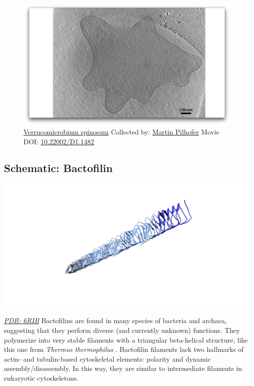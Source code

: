 \documentclass[]{tufte-book}
\begin{document}
\begin{figure}
\includegraphics{movie_stills/3_6} \caption[\protect\hyperlink{tree}{Verrucomicrobium spinosum} Collected
by: \protect\hyperlink{martin_pilhofer}{Martin Pilhofer} Movie DOI:
\href{https://doi.org/10.22002/D1.1482}{10.22002/D1.1482}]{\protect\hyperlink{tree}{Verrucomicrobium spinosum} Collected
by: \protect\hyperlink{martin_pilhofer}{Martin Pilhofer} Movie DOI:
\href{https://doi.org/10.22002/D1.1482}{10.22002/D1.1482}}\label{fig:3-6}
\end{figure}

\hypertarget{Bactofilin}{\subsection*{Schematic:
Bactofilin}\label{Bactofilin}}

\includegraphics{img/schematics/3_6_1}

\href{http://rcsb.org/structure/6RIB}{\emph{PDB: 6RIB}} Bactofilins are
found in many species of bacteria and archaea, suggesting that they
perform diverse (and currently unknown) functions. They polymerize into
very stable filaments with a triangular beta-helical structure, like
this one from \emph{Thermus thermophilus} \citep{deng2019}. Bactofilin
filaments lack two hallmarks of actin- and tubulin-based cytoskeletal
elements: polarity and dynamic assembly/disassembly. In this way, they
are similar to intermediate filaments in eukaryotic cytoskeletons.
\end{document}
